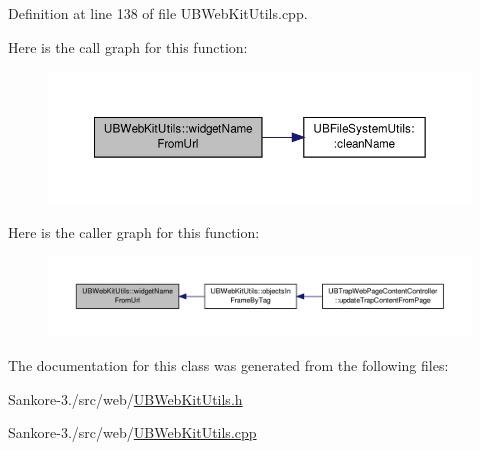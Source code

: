 Definition at line 138 of file U\-B\-Web\-Kit\-Utils.\-cpp.



Here is the call graph for this function\-:
\nopagebreak
\begin{figure}[H]
\begin{center}
\leavevmode
\includegraphics[width=350pt]{d7/d97/class_u_b_web_kit_utils_ab316ce91eefc843af28efb75e2dc5928_cgraph}
\end{center}
\end{figure}




Here is the caller graph for this function\-:
\nopagebreak
\begin{figure}[H]
\begin{center}
\leavevmode
\includegraphics[width=350pt]{d7/d97/class_u_b_web_kit_utils_ab316ce91eefc843af28efb75e2dc5928_icgraph}
\end{center}
\end{figure}




The documentation for this class was generated from the following files\-:\begin{DoxyCompactItemize}
\item 
Sankore-\/3./src/web/\hyperlink{_u_b_web_kit_utils_8h}{U\-B\-Web\-Kit\-Utils.\-h}\item 
Sankore-\/3./src/web/\hyperlink{_u_b_web_kit_utils_8cpp}{U\-B\-Web\-Kit\-Utils.\-cpp}\end{DoxyCompactItemize}
